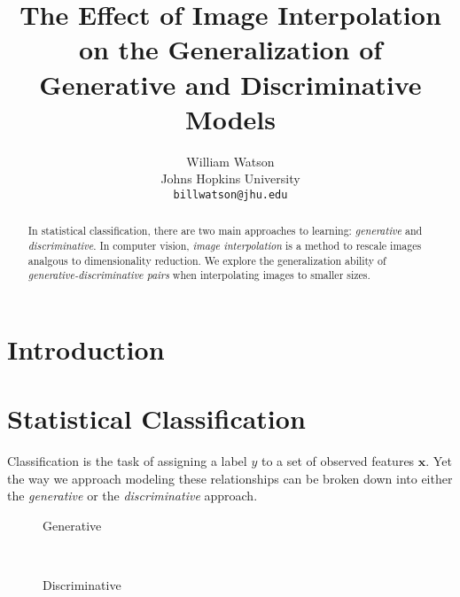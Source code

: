 \documentclass{article}
\title{The Effect of Image Interpolation on the Generalization of Generative and Discriminative Models}
\author{%
  William Watson \\
  Johns Hopkins University\\
  \texttt{billwatson@jhu.edu} \\
}
\begin{document}

\maketitle

\begin{abstract}
  In statistical classification, there are two main approaches to learning:
  \textit{generative} and \textit{discriminative}. In computer vision,
  \textit{image interpolation} is a method to rescale images analgous to
  dimensionality reduction. We explore the generalization ability of
  \textit{generative-discriminative pairs} when interpolating images to smaller
  sizes.
\end{abstract}


\section{Introduction}
\label{sec:intro}


\section{Statistical Classification}
Classification is the task of assigning a label $y$ to a set of observed
features $\mathbf{x}$. Yet the way we approach modeling these relationships
can be broken down into either the \textit{generative} or the
\textit{discriminative} approach.

\begin{figure*}[h!]
    \centering
    \begin{subfigure}[t]{0.15\textwidth}
        \centering
        \caption*{Generative}
    \end{subfigure}%
    ~
    \begin{subfigure}[t]{0.15\textwidth}
        \centering
        \caption*{Discriminative}
    \end{subfigure}
\end{figure*}
\end{document}
